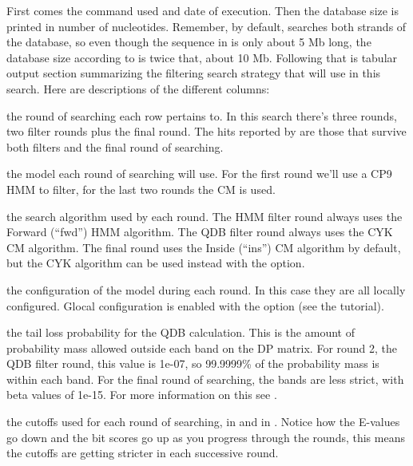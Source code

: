 First comes the command used and date of execution. Then the database
size is printed in number of nucleotides. Remember, by default,
 searches both strands of the database, so even though
the sequence in  is only about 5 Mb
long, the database size according to  is twice that,
about 10 Mb. Following that is tabular output section summarizing the
filtering search strategy that  will use in this
search. Here are descriptions of the different columns:

\begin{wideitem}
\item[\emprog{rnd}] the round of searching each row pertains
  to. In this search there's three rounds, two filter rounds plus
  the final round. The hits reported by  are those that
  survive both filters and the final round of searching.

\item[\emprog{mod}] the model each round of searching will use. For
  the first round we'll use a CP9 HMM to filter, for the last two
  rounds the CM is used.

\item[\emprog{alg}] the search algorithm used by each round. 
  The HMM filter round always uses the Forward (``fwd'') HMM algorithm. 
  The QDB filter round always uses the CYK CM algorithm. The final
  round uses the Inside (``ins'') CM algorithm by default, but the 
  CYK algorithm can be used instead with the  option. 

\item[\emprog{cfg}] the configuration of the model during each
  round. In this case they are all locally configured. Glocal
  configuration is enabled with the  option (see the tutorial).

\item[\emprog{beta}] the tail loss probability for the QDB
  calculation. This is the amount of probability mass allowed outside
  each band on the DP matrix. For round 2, the QDB filter round, this
  value is 1e-07, so 99.9999\% of the probability mass is within each
  band. For the final round of searching, the bands are less strict,
  with beta values of 1e-15. For more information on this see
  \cite{NawrockiEddy07}.

\item[\emprog{cutoffs}] the cutoffs used for each round of searching,
  in  and in . Notice how the E-values go
  down and the bit scores go up as you progress through the rounds,
  this means the cutoffs are getting stricter in each successive
  round. 


\end{wideitem}
